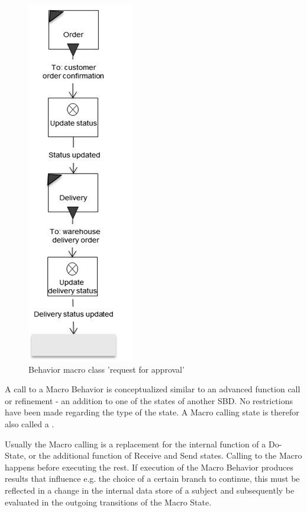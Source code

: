 \begin{figure}[htbp]
	\centering
	\includegraphics[width=0.2\linewidth]{Figures/Ontology/SubjectBehavior/MacroBehavior}
	\caption[Behavior macro class 'request for approval']{Behavior macro class 'request for approval'}
	\label{fig:macrobehavior}
\end{figure}

A call to a Macro Behavior is conceptualized similar to an advanced function call or refinement - an addition to one of the states of another SBD. No restrictions have been made regarding the type of the state. A Macro calling state is therefor also called a .

Usually the Macro calling is a replacement for the internal function of a Do-State, or the additional function of Receive and Send states. Calling to the Macro happens before executing the rest. If execution of the Macro Behavior produces results that influence e.g. the choice of a certain branch to continue, this must be reflected in a change in the internal data store of a subject and subsequently be evaluated in the outgoing transitions of the Macro State. 



